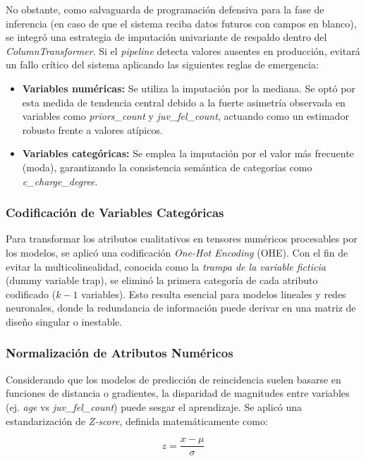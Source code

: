 \documentclass[11pt,a4paper]{article}
\begin{document}
No obstante, como salvaguarda de programación defensiva para la fase de inferencia (en caso de que el sistema reciba datos futuros con campos en blanco), se integró una estrategia de imputación univariante de respaldo dentro del \textit{ColumnTransformer}. Si el \textit{pipeline} detecta valores ausentes en producción, evitará un fallo crítico del sistema aplicando las siguientes reglas de emergencia:
\begin{itemize}
    \item \textbf{Variables numéricas:} Se utiliza la imputación por la mediana. Se optó por esta medida de tendencia central debido a la fuerte asimetría observada en variables como \textit{priors\_count} y \textit{juv\_fel\_count}, actuando como un estimador robusto frente a valores atípicos.
    \item \textbf{Variables categóricas:} Se emplea la imputación por el valor más frecuente (moda), garantizando la consistencia semántica de categorías como \textit{c\_charge\_degree}.
\end{itemize}

\subsubsection{Codificación de Variables Categóricas}

Para transformar los atributos cualitativos en tensores numéricos procesables por los modelos, se aplicó una codificación \textit{One-Hot Encoding} (OHE). Con el fin de evitar la multicolinealidad, conocida como la \textit{trampa de la variable ficticia} (dummy variable trap), se eliminó la primera categoría de cada atributo codificado ($k-1$ variables). Esto resulta esencial para modelos lineales y redes neuronales, donde la redundancia de información puede derivar en una matriz de diseño singular o inestable.

\subsubsection{Normalización de Atributos Numéricos}

Considerando que los modelos de predicción de reincidencia suelen basarse en funciones de distancia o gradientes, la disparidad de magnitudes entre variables (ej. \textit{age} vs \textit{juv\_fel\_count}) puede sesgar el aprendizaje. Se aplicó una estandarización de \textit{Z-score}, definida matemáticamente como:

\begin{equation}
    z = \frac{x - \mu}{\sigma}
\end{equation}
\end{document}
